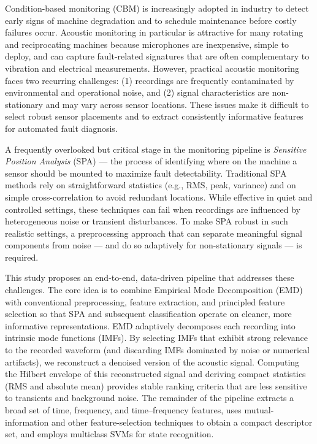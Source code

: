 \documentclass[12pt,a4paper]{article}
\begin{document}
Condition-based monitoring (CBM) is increasingly adopted in industry to detect early signs of machine degradation and to schedule maintenance before costly failures occur. Acoustic monitoring in particular is attractive for many rotating and reciprocating machines because microphones are inexpensive, simple to deploy, and can capture fault-related signatures that are often complementary to vibration and electrical measurements. However, practical acoustic monitoring faces two recurring challenges: (1) recordings are frequently contaminated by environmental and operational noise, and (2) signal characteristics are non-stationary and may vary across sensor locations. These issues make it difficult to select robust sensor placements and to extract consistently informative features for automated fault diagnosis.

A frequently overlooked but critical stage in the monitoring pipeline is \emph{Sensitive Position Analysis} (SPA) — the process of identifying where on the machine a sensor should be mounted to maximize fault detectability. Traditional SPA methods rely on straightforward statistics (e.g., RMS, peak, variance) and on simple cross-correlation to avoid redundant locations. While effective in quiet and controlled settings, these techniques can fail when recordings are influenced by heterogeneous noise or transient disturbances. To make SPA robust in such realistic settings, a preprocessing approach that can separate meaningful signal components from noise — and do so adaptively for non-stationary signals — is required.

This study proposes an end-to-end, data-driven pipeline that addresses these challenges. The core idea is to combine Empirical Mode Decomposition (EMD) with conventional preprocessing, feature extraction, and principled feature selection so that SPA and subsequent classification operate on cleaner, more informative representations. EMD adaptively decomposes each recording into intrinsic mode functions (IMFs). By selecting IMFs that exhibit strong relevance to the recorded waveform (and discarding IMFs dominated by noise or numerical artifacts), we reconstruct a denoised version of the acoustic signal. Computing the Hilbert envelope of this reconstructed signal and deriving compact statistics (RMS and absolute mean) provides stable ranking criteria that are less sensitive to transients and background noise. The remainder of the pipeline extracts a broad set of time, frequency, and time–frequency features, uses mutual-information and other feature-selection techniques to obtain a compact descriptor set, and employs multiclass SVMs for state recognition.
\end{document}
